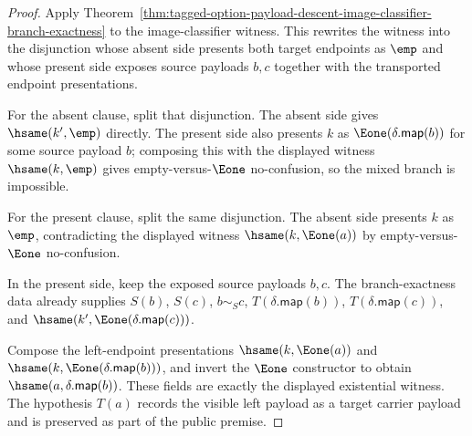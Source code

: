 \begin{proof}
Apply Theorem~\ref{thm:tagged-option-payload-descent-image-classifier-branch-exactness}
to the image-classifier witness. This rewrites the witness into the disjunction
whose absent side presents both target endpoints as $\emp$ and whose present side
exposes source payloads $b,c$ together with the transported endpoint
presentations.

For the absent clause, split that disjunction. The absent side gives
$\hsame(k',\emp)$ directly. The present side also presents $k$ as
$\Eone(\delta.\mathsf{map}(b))$ for some source payload $b$; composing this with
the displayed witness $\hsame(k,\emp)$ gives empty-versus-$\Eone$ no-confusion,
so the mixed branch is impossible.

For the present clause, split the same disjunction. The absent side presents $k$
as $\emp$, contradicting the displayed witness $\hsame(k,\Eone(a))$ by
empty-versus-$\Eone$ no-confusion.

In the present side, keep the exposed source payloads $b,c$. The branch-exactness
data already supplies $S(b)$, $S(c)$, $b\sim_S c$,
$T(\delta.\mathsf{map}(b))$, $T(\delta.\mathsf{map}(c))$, and
$\hsame(k',\Eone(\delta.\mathsf{map}(c)))$.

Compose the left-endpoint presentations $\hsame(k,\Eone(a))$ and
$\hsame(k,\Eone(\delta.\mathsf{map}(b)))$, and invert the $\Eone$ constructor to
obtain $\hsame(a,\delta.\mathsf{map}(b))$. These fields are exactly the displayed
existential witness. The hypothesis $T(a)$ records the visible left payload as a
target carrier payload and is preserved as part of the public premise.
\end{proof}

